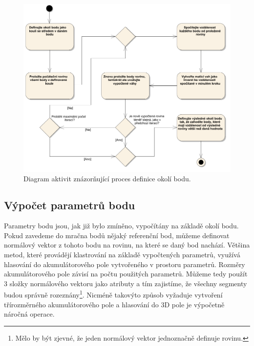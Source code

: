 \documentclass[11pt,twoside,a4paper]{book}
\begin{document}
\begin{figure}[ht]
\begin{center}
\includegraphics[width=\textwidth]{figures/okoli-diagram}
\caption{Diagram aktivit znázorňující proces definice okolí bodu.}
\label{fig:diagram-okoli}
\end{center}
\end{figure}

\newpage
\subsection{Výpočet parametrů bodu}

Parametry bodu jsou, jak již bylo zmíněno, vypočítány na základě okolí bodu. Pokud zavedeme do mračna bodů nějaký referenční bod, můžeme definovat normálový vektor z tohoto bodu na rovinu, na které se daný bod nachází. Většina metod, které provádějí klastrování na základě vypočtených parametrů, využívá hlasování do akumulátorového pole vytvořeného v prostoru parametrů. Rozměry akumulátorového pole závisí na počtu použitých parametrů. Můžeme tedy použít 3 složky normálového vektoru jako atributy a tím zajistíme, že všechny segmenty budou správně rozeznány\footnote{Mělo by být zjevné, že jeden normálový vektor jednoznačně definuje rovinu.}. Nicméně takovýto způsob vyžaduje vytvoření třírozměrného akumulátorového pole a hlasování do 3D pole je výpočetně náročná operace. 
\end{document}
